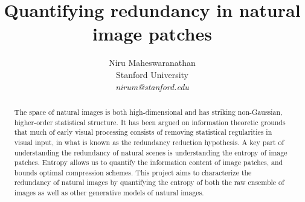 \documentclass[10pt,twocolumn,letterpaper]{article}
\begin{document}
\title{Quantifying redundancy in natural image patches}

\author{Niru Maheswaranathan\\
Stanford University\\
\textit{nirum@stanford.edu}
}

\maketitle
\thispagestyle{empty}

\begin{abstract}
The space of natural images is both high-dimensional and has striking non-Gaussian, higher-order statistical structure. It has been argued on information theoretic grounds that much of early visual processing consists of removing statistical regularities in visual input, in what is known as the redundancy reduction hypothesis. A key part of understanding the redundancy of natural scenes is understanding the entropy of image patches. Entropy allows us to quantify the information content of image patches, and bounds optimal compression schemes. This project aims to characterize the redundancy of natural images by quantifying the entropy of both the raw ensemble of images as well as other generative models of natural images.
\end{abstract}

\end{document}
